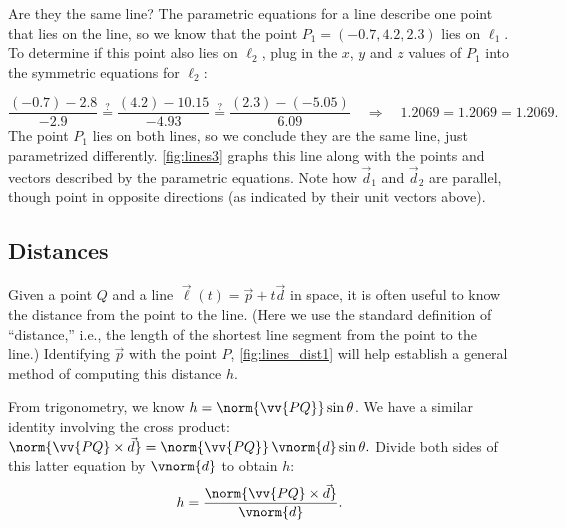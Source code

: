 {Are they the same line? The parametric equations for a line describe one point that lies on the line, so we know that the point $P_1 = (-0.7,4.2,2.3)$ lies on $\ell_1$. To determine if this point also lies on $\ell_2$, plug in the $x$, $y$ and $z$ values of $P_1$ into the symmetric equations for $\ell_2$:

\small
$$\frac{(-0.7)-2.8}{-2.9} \stackrel{?}{=} \frac{(4.2)-10.15}{-4.93} \stackrel{?}{=} \frac{(2.3)-(-5.05)}{6.09} \quad \Rightarrow \quad 1.2069=1.2069=1.2069.$$
\normalsize
{}
The point $P_1$ lies on both lines, so we conclude they are the same line, just parametrized differently. \autoref{fig:lines3} graphs this line along with the points and vectors described by the parametric equations. Note how $\vec d_1$ and $\vec d_2$ are parallel, though point in opposite directions (as indicated by their unit vectors above).}

\subsection*{Distances}

Given a point $Q$ and a line $\vec\ell(t) = \vec p+t\vec d$ in space, it is often useful to know the distance from the point to the line. (Here we use the standard definition of ``distance,'' i.e., the length of the shortest line segment from the point to the line.) Identifying $\vec p$ with the point $P$, \autoref{fig:lines_dist1} will help establish a general method of computing this distance $h$.


From trigonometry, we know $h = \norm{\vv{PQ}}\sin\theta$. We have a similar identity involving the cross product: $\norm{\vv{PQ}\times \vec d} = \norm{\vv{PQ}}\, \vnorm{d}\sin\theta.$ Divide both sides of this latter equation by $\vnorm{d}$ to obtain $h$:
\begin{equation}
h = \frac{\norm{\vv{PQ}\times \vec d}}{\vnorm{d}}.
\label{eq:lines2}
\end{equation}

